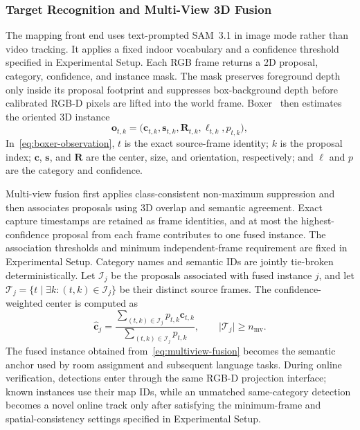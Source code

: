 \documentclass[letterpaper,10pt,journal]{IEEEtran}
\begin{document}
\subsubsection{Target Recognition and Multi-View 3D Fusion}

The mapping front end uses text-prompted SAM~3.1 in image mode rather than video tracking. It applies a fixed indoor vocabulary and a confidence threshold specified in Experimental Setup. Each RGB frame returns a 2D proposal, category, confidence, and instance mask. The mask preserves foreground depth only inside its proposal footprint and suppresses box-background depth before calibrated RGB-D pixels are lifted into the world frame. Boxer~\cite{detone2026boxer} then estimates the oriented 3D instance
\begin{equation}
\mathbf{o}_{t,k}
=\bigl(\mathbf{c}_{t,k},\mathbf{s}_{t,k},\mathbf{R}_{t,k},
\ell_{t,k},p_{t,k}\bigr),
\label{eq:boxer-observation}
\end{equation}
In~\eqref{eq:boxer-observation}, $t$ is the exact source-frame identity; $k$ is the proposal index; $\mathbf{c}$, $\mathbf{s}$, and $\mathbf{R}$ are the center, size, and orientation, respectively; and $\ell$ and $p$ are the category and confidence.

Multi-view fusion first applies class-consistent non-maximum suppression and then associates proposals using 3D overlap and semantic agreement. Exact capture timestamps are retained as frame identities, and at most the highest-confidence proposal from each frame contributes to one fused instance. The association thresholds and minimum independent-frame requirement are fixed in Experimental Setup. Category names and semantic IDs are jointly tie-broken deterministically. Let $\mathcal I_j$ be the proposals associated with fused instance $j$, and let $\mathcal T_j=\{t\mid\exists k:(t,k)\in\mathcal I_j\}$ be their distinct source frames. The confidence-weighted center is computed as
\begin{equation}
\widehat{\mathbf{c}}_{j}=
\frac{\sum_{(t,k)\in\mathcal I_j}p_{t,k}\mathbf{c}_{t,k}}
     {\sum_{(t,k)\in\mathcal I_j}p_{t,k}},
\qquad
\lvert\mathcal T_j\rvert\geq n_{\mathrm{mv}}.
\label{eq:multiview-fusion}
\end{equation}
The fused instance obtained from~\eqref{eq:multiview-fusion} becomes the semantic anchor used by room assignment and subsequent language tasks. During online verification, detections enter through the same RGB-D projection interface; known instances use their map IDs, while an unmatched same-category detection becomes a novel online track only after satisfying the minimum-frame and spatial-consistency settings specified in Experimental Setup.
\end{document}
